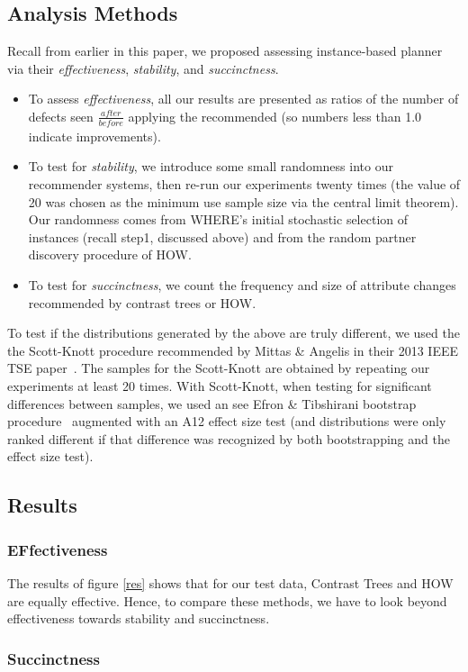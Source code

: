 \documentclass[conference]{IEEEtran}
\newcommand{\bi}{\begin{itemize}}
\newcommand{\ei}{\end{itemize}}
\begin{document}
	\subsection{Analysis Methods}
	Recall from earlier in this paper, we proposed assessing instance-based planner
	via their {\em effectiveness}, {\em stability}, and  {\em succinctness}.
\bi
\item
	To assess {\em effectiveness}, all our results are  presented as ratios of the number of defects seen $\frac{\mathit{after}}{\mathit{before}}$ applying the recommended  (so numbers less than 1.0 indicate improvements). 
	\item
	To test for {\em stability}, we introduce some small randomness into our recommender systems, then re-run our experiments twenty times (the value of 20 was chosen as the minimum use sample size via the central limit theorem). Our randomness comes from WHERE's initial stochastic selection of instances (recall step1, discussed above) and from the random partner discovery procedure of HOW.
	\item
	To test for {\em succinctness}, we count the frequency and size of attribute changes recommended by contrast trees or HOW.
	\ei
To test if the distributions generated by the above are truly different, we
used the the Scott-Knott procedure recommended by Mittas \& Angelis in their 2013
IEEE TSE paper~\cite{mittas13}. The samples for the Scott-Knott are  obtained by repeating our experiments at least 20 times. With Scott-Knott, when testing for significant differences between samples, we used an see Efron \&
Tibshirani bootstrap procedure~\cite[p220-223]{efron93} augmented with an A12 effect size test (and distributions were only ranked  different if that difference was recognized by
both bootstrapping and the effect size test).

\subsection{Results}
	
\subsubsection{EFfectiveness}
The results of figure \ref{res} shows that for our test data, Contrast Trees and HOW are equally effective. Hence, to compare these methods, we have to look
beyond effectiveness towards stability and succinctness.

\subsubsection{Succinctness}
\end{document}
